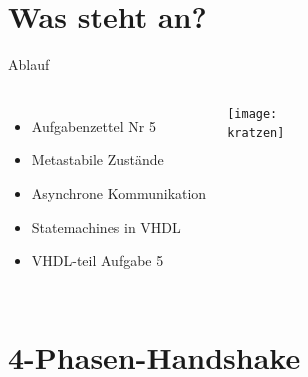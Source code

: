   \section{Was steht an?}
  \begin{frame}{Ablauf}
    \begin{columns}
        \begin{itemize}
          \item Aufgabenzettel Nr 5
          \item Metastabile Zustände
          \item Asynchrone Kommunikation
          \item Statemachines in VHDL
          \item VHDL-teil Aufgabe 5
        \end{itemize}
        \texttt{[image: \\kratzen]}
    \end{columns}
  \end{frame}


  \section{4-Phasen-Handshake}


